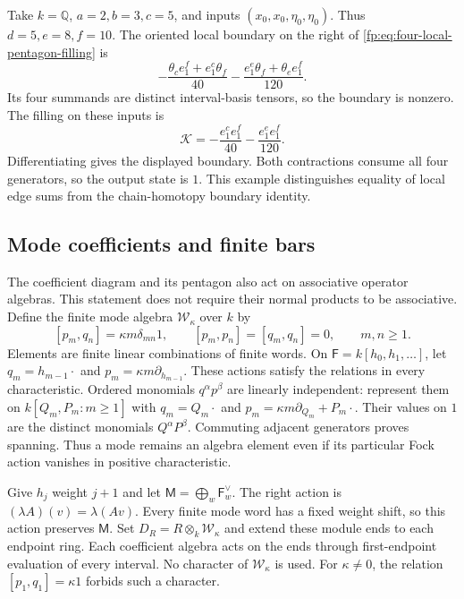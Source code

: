 \begin{example}
Take \(k=\mathbb Q\), \(a=2,b=3,c=5\), and inputs
\((x_0,x_0,\eta_0,\eta_0)\).  Thus \(d=5,e=8,f=10\).
The oriented local boundary on the right of
\eqref{fp:eq:four-local-pentagon-filling} is
\[
 -\frac{\theta_ce_1^f+e_1^c\theta_f}{40}
 -\frac{e_1^e\theta_f+\theta_ee_1^f}{120}.
\]
Its four summands are distinct interval-basis tensors, so the
boundary is nonzero.  The filling on these inputs is
\[
 \mathcal K=-\frac{e_1^ce_1^f}{40}-\frac{e_1^ee_1^f}{120}.
\]
Differentiating gives the displayed boundary.  Both contractions
consume all four generators, so the output state is \(1\).
This example distinguishes equality of local edge sums from the
chain-homotopy boundary identity.
\end{example}

\subsection{Mode coefficients and finite bars}
\label{fp:sec:four-mode-bars}

The coefficient diagram and its pentagon also act on associative
operator algebras.  This statement does not require their normal
products to be associative.  Define the finite mode algebra
\(\mathscr W_\kappa\) over \(k\) by
\[
 [p_m,q_n]=\kappa m\delta_{mn}1,\qquad
 [p_m,p_n]=[q_m,q_n]=0,\qquad m,n\ge1.
\]
Elements are finite linear combinations of finite words.  On
\(\mathsf F=k[h_0,h_1,\ldots]\), let
\(q_m=h_{m-1}\cdot\) and
\(p_m=\kappa m\partial_{h_{m-1}}\).
These actions satisfy the relations in every characteristic.
Ordered monomials \(q^\alpha p^\beta\) are linearly independent:
represent them on \(k[Q_m,P_m:m\ge1]\) with
\(q_m=Q_m\cdot\) and
\(p_m=\kappa m\partial_{Q_m}+P_m\cdot\).
Their values on \(1\) are the distinct monomials
\(Q^\alpha P^\beta\).  Commuting adjacent generators proves
spanning.  Thus a mode remains an algebra element even if its
particular Fock action vanishes in positive characteristic.

Give \(h_j\) weight \(j+1\) and let
\(\mathsf M=\bigoplus_w\mathsf F_w^\vee\).
The right action is \((\lambda A)(v)=\lambda(Av)\).
Every finite mode word has a fixed weight shift, so this action
preserves \(\mathsf M\).  Set
\(D_R=R\otimes_k\mathscr W_\kappa\) and extend these
module ends to each endpoint ring.  Each coefficient algebra acts
on the ends through first-endpoint evaluation of every interval.
No character of \(\mathscr W_\kappa\) is used.
For \(\kappa\ne0\), the relation
\([p_1,q_1]=\kappa1\) forbids such a character.


